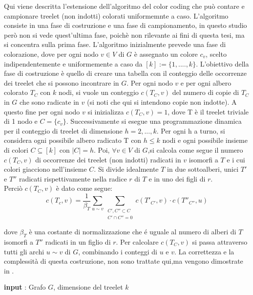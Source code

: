 Qui viene descritta l'estensione dell'algoritmo del color coding che pu\`o contare e campionare treelet (non indotti) colorati uniformemnte a caso.
L'algoritmo consiste in una fase di costruzione e una fase di campionamento, in questo studio per\`o non si vede quest'ultima fase, poich\`e non rilevante ai fini di questa tesi, ma si concentra sulla prima fase.
L'algoritmo inizialmente prevede una fase di colorazione, dove per ogni nodo $ v \in V $ di $ G $ \`e assegnato un colore $ c_v $, scelto indipendentemente e uniformemente a caso da $ [k] := \{1,....,k\} $.
L'obiettivo della fase di costruzione \`e quello di creare una tabella con il conteggio delle occorrenze dei treelet che si possono incontrare in $ G $.
Per ogni nodo $ v $ e per ogni albero colorato $ T_C $ con $ k $ nodi, si vuole un conteggio $ c(T_C , v) $ del numero di copie di $ T_C $  in $ G $ che sono radicate in $ v $ (si noti che qui si intendono copie non indotte).
A questo fine per ogni nodo $ v $ si inizializza $ c(T_C , v) = 1 $, dove T \`e il treelet triviale di 1 nodo e $ C = \{c_v\} $.
Successivamente si esegue una programmazione dinamica per il conteggio di treelet di dimensione $ h = 2,...,k $.
Per ogni h a turno, si considera ogni possibile albero radicato T con $ h \le k $ nodi e ogni possibile insieme di colori $ C \subseteq [k] $ con $ |C| = h $.
Poi, $ \forall v \in V$ di $ G $,si calcola come segue il numero $ c(T_C,v) $ di occorrenze dei treelet (non indotti) radicati in $ v $ isomorfi a $ T $ e i cui colori giacciono nell'insieme $ C $. Si divide idealmente $ T $ in due sottoalberi, unici $ T' $ e $ T'' $  radicati rispettivamente nella radice $ r $ di $ T $ e in uno dei figli di $ r $.\\
Perci\`o $ c(T_C,v) $ \`e dato come segue:
\begin{equation}\label{conta}
	c(T_c,v)=\frac{1}{\beta_T}\sum_{u\sim v}\sum_{\substack{{C',C''\subset C}\\{C'\cap C'' =0}}}c(T'_{C'},v)\cdot c(T''_{C''},u)
\end{equation}

dove $ \beta_T $ \`e una costante di normalizzazione che \'e uguale al numero di alberi di $ T $ isomorfi a $ T'' $ radicati in un figlio di $ r $. Per calcolare $ c(T_C,v) $ si passa attraverso tutti gli archi $ u\sim v $ di $ G $, combinando i conteggi di $ u $ e $ v $. La correttezza e la complessit\`a di questa costruzione, non sono trattate qui,ma vengono dimostrate in \cite{alon1995color}.

\begin{algorithm}[H]
	\SetAlgoLined
	\caption{Fase di costruzione}
 	\textbf{input} : Grafo $ G $, dimensione del treelet $ k $ \;	
 			
\end{algorithm}\mbox{}\\

